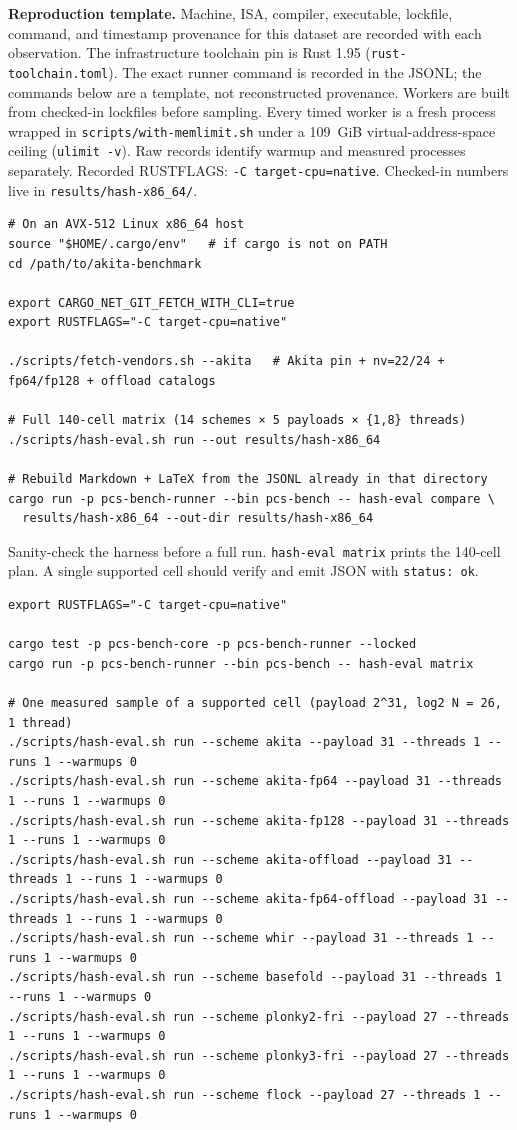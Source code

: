 \medskip
\noindent\textbf{Reproduction template.}
Machine, ISA, compiler, executable, lockfile, command, and timestamp provenance
for this dataset are recorded with each observation. The infrastructure
toolchain pin is Rust 1.95 (\texttt{rust-toolchain.toml}).
The exact runner command is recorded in the JSONL; the commands below are a
template, not reconstructed provenance.
Workers are built from checked-in lockfiles before sampling. Every timed worker
is a fresh process wrapped in \texttt{scripts/with-memlimit.sh} under a
109~GiB virtual-address-space ceiling (\texttt{ulimit -v}).
Raw records
identify warmup and measured processes separately. Recorded RUSTFLAGS:
\texttt{{-C target-cpu=native}}. Checked-in numbers live in
\texttt{results/hash-x86\_64/}.
\begin{verbatim}
# On an AVX-512 Linux x86_64 host
source "$HOME/.cargo/env"   # if cargo is not on PATH
cd /path/to/akita-benchmark

export CARGO_NET_GIT_FETCH_WITH_CLI=true
export RUSTFLAGS="-C target-cpu=native"

./scripts/fetch-vendors.sh --akita   # Akita pin + nv=22/24 + fp64/fp128 + offload catalogs

# Full 140-cell matrix (14 schemes × 5 payloads × {1,8} threads)
./scripts/hash-eval.sh run --out results/hash-x86_64

# Rebuild Markdown + LaTeX from the JSONL already in that directory
cargo run -p pcs-bench-runner --bin pcs-bench -- hash-eval compare \
  results/hash-x86_64 --out-dir results/hash-x86_64
\end{verbatim}
\noindent Sanity-check the harness before a full run.
\texttt{hash-eval matrix} prints the 140-cell plan.
A single supported cell should verify and emit JSON with \texttt{status: ok}.
\begin{verbatim}
export RUSTFLAGS="-C target-cpu=native"

cargo test -p pcs-bench-core -p pcs-bench-runner --locked
cargo run -p pcs-bench-runner --bin pcs-bench -- hash-eval matrix

# One measured sample of a supported cell (payload 2^31, log2 N = 26, 1 thread)
./scripts/hash-eval.sh run --scheme akita --payload 31 --threads 1 --runs 1 --warmups 0
./scripts/hash-eval.sh run --scheme akita-fp64 --payload 31 --threads 1 --runs 1 --warmups 0
./scripts/hash-eval.sh run --scheme akita-fp128 --payload 31 --threads 1 --runs 1 --warmups 0
./scripts/hash-eval.sh run --scheme akita-offload --payload 31 --threads 1 --runs 1 --warmups 0
./scripts/hash-eval.sh run --scheme akita-fp64-offload --payload 31 --threads 1 --runs 1 --warmups 0
./scripts/hash-eval.sh run --scheme whir --payload 31 --threads 1 --runs 1 --warmups 0
./scripts/hash-eval.sh run --scheme basefold --payload 31 --threads 1 --runs 1 --warmups 0
./scripts/hash-eval.sh run --scheme plonky2-fri --payload 27 --threads 1 --runs 1 --warmups 0
./scripts/hash-eval.sh run --scheme plonky3-fri --payload 27 --threads 1 --runs 1 --warmups 0
./scripts/hash-eval.sh run --scheme flock --payload 27 --threads 1 --runs 1 --warmups 0
\end{verbatim}
